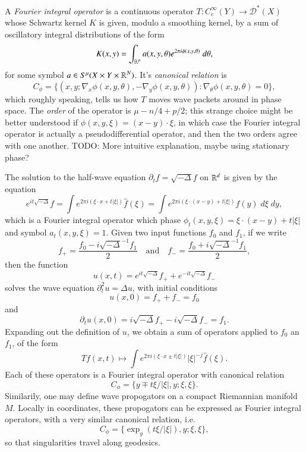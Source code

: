 A \emph{Fourier integral operator} is a continuous operator $T: C_c^\infty(Y) \to \mathcal{D}^*(X)$ whose Schwartz kernel $K$ is given, modulo a smoothing kernel, by a sum of oscillatory integral distributions of the form
%
\[ K(x,y) = \int_{\operatorname{\mathbb{R}}^p} a(x,y,\theta) e^{2 \pi i \phi(x,y,\theta)}\; d\theta, \]
%
for some symbol $a \in S^\mu(X \times Y \times \operatorname{\mathbb{R}}^N)$. It's \emph{canonical relation} is
%
\[ C_\phi = \{ (x,y; \nabla_x \phi(x,y,\theta), - \nabla_y \phi(x,y,\theta) ) : \nabla_\theta \phi(x,y,\theta) = 0 \}, \]
%
which roughly speaking, tells us how $T$ moves wave packets around in phase space. The \emph{order} of the operator is $\mu - n/4 + p/2$; this strange choice might be better understood if $\phi(x,y,\xi) = (x - y) \cdot \xi$, in which case the Fourier integral operator is actually a pseudodifferential operator, and then the two orders agree with one another. TODO: More intuitive explanation, maybe using stationary phase?

\begin{example}
    The solution to the half-wave equation $\partial_t f = \sqrt{-\Delta} f$ on $\operatorname{\mathbb{R}}^d$ is given by the equation
    \[ e^{i t \sqrt{-\Delta}} f = \int e^{2 \pi i (\xi \cdot x + t |\xi|)} \widehat{f}(\xi) = \int e^{2 \pi i (\xi \cdot (x - y) + t |\xi|)} f(y)\; d\xi\; dy, \]
    which is a Fourier integral operator which phase $\phi_t(x,y,\xi) = \xi \cdot (x - y) + t |\xi|$ and symbol $a_t(x,y,\xi) = 1$. Given two input functions $f_0$ and $f_1$, if we write
    \[ f_+ = \frac{f_0 - i \sqrt{-\Delta}^{-1} f_1}{2}  \quad\text{and}\quad   f_- = \frac{f_0 + i \sqrt{-\Delta}^{-1} f_1}{2}, \]
    then the function
    \[ u(x,t) = e^{it \sqrt{-\Delta}} f_+ + e^{-i t \sqrt{-\Delta}} f_- \]
    solves the wave equation $\partial_t^2 u = \Delta u$, with initial conditions
    \[ u(x,0) = f_+ + f_- = f_0 \]
    and
    \[ \partial_t u(x,0) = i \sqrt{-\Delta} f_+ - i \sqrt{-\Delta} f_- = f_1. \]
    Expanding out the definition of $u$, we obtain a sum of operators applied to $f_0$ an $f_1$, of the form
    \[ Tf(x,t) \mapsto \int e^{2 \pi i (\xi \cdot x \pm t |\xi|)} |\xi|^{-j} \widehat{f}(\xi). \]
    Each of these operators is a Fourier integral operator with canonical relation
    \[ C_\phi = \{ y \mp t \xi / |\xi|, y; \xi, \xi \}. \]
    Similarily, one may define wave propogators on a compact Riemannian manifold $M$. Locally in coordinates, these propogators can be expressed as Fourier integral operators, with a very similar canonical relation, i.e.
    \[ C_\phi = \{ \exp_y(t \xi / |\xi|), y; \xi, \xi \}, \]
    so that singularities travel along geodesics.
\end{example}

